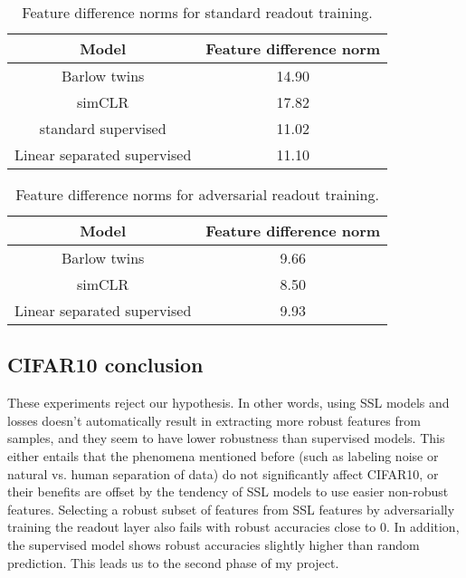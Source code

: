 \documentclass[../thesis.tex]{subfiles}
\begin{document}
	
	
	
	\begin{table}[!htbp]
		\centering
		\begin{tabular}{|c|c|}
			\hline
			Model                       & Feature difference norm \\
			\hline
			Barlow twins                & 14.90                   \\
			\hline
			simCLR                      & 17.82                   \\
			\hline
			standard supervised         & 11.02                   \\
			\hline
			Linear separated supervised & 11.10                   \\
			\hline                
		\end{tabular}
		\caption{Feature difference norms for standard readout training.}
		\label{tb:std_readout_training}
	\end{table}
	
	
	\begin{table}[!htbp]
		\centering
		\begin{tabular}{|c|c|}
			\hline
			Model                       & Feature difference norm \\
			\hline
			Barlow twins                & 9.66                   \\
			\hline
			simCLR                      & 8.50                   \\
			\hline
			Linear separated supervised & 9.93                  \\
			\hline
		\end{tabular}
		\caption{Feature difference norms for adversarial readout training.}
		\label{tb:adv_readout_training}
	\end{table}
	
	
	
	
	\subsection{CIFAR10 conclusion}
	
	These experiments reject our hypothesis. In other words, using SSL models and losses doesn't automatically result in extracting more robust features from samples, and they seem to have lower robustness than supervised models. This either entails that the phenomena mentioned before (such as labeling noise or natural vs. human separation of data) do not significantly affect CIFAR10, or their benefits are offset by the tendency of SSL models to use easier non-robust features. Selecting a robust subset of features from SSL features by adversarially training the readout layer also fails with robust accuracies close to 0. In addition, the supervised model shows robust accuracies slightly higher than random prediction. This leads us to the second phase of my project.
	
	
	
\end{document}
